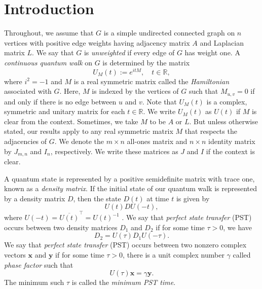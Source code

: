 \documentclass[11pt]{article}
\newcommand{\bx}{\mathbf x}
\newcommand{\by}{\mathbf y}
\def\R{\mathbb{R}}
\begin{document}

\section{Introduction}

Throughout, we assume that $G$ is a simple undirected connected graph on $n$ vertices with positive edge weights having adjacency matrix $A$ and Laplacian matrix $L$. We say that $G$ is \textit{unweighted} if every edge of $G$ has weight one. A \textit{continuous quantum walk} on $G$ is determined by the matrix 
\begin{equation}
\label{Eq:transmat}
U_M(t):=e^{itM}, \quad t\in\R,
\end{equation}
where $i^2=-1$ and $M$ is a real symmetric matrix called the \textit{Hamiltonian} associated with $G$. Here, $M$ is indexed by the vertices of $G$ such that $M_{u,v}=0$ if and only if there is no edge between $u$ and $v$. Note that $U_M(t)$ is a complex, symmetric and unitary matrix for each $t\in \R$. We write $U_M(t)$ as $U(t)$ if $M$ is clear from the context. Sometimes, we take $M$ to be $A$ or $L$. But unless otherwise stated, our results apply to any real symmetric matrix $M$ that respects the adjacencies of $G$. We denote the $m\times n$ all-ones matrix and $n\times n$ identity matrix by $J_{m,n}$ and $I_n$, respectively. We write these matrices as $J$ and $I$ if the context is clear.

A quantum state is represented by a positive semidefinite matrix with trace one, known as a \textit{density matrix}. If the initial state of our quantum walk is represented by a density matrix $D$, then the state $D(t)$ at time $t$ is given by $$U(t)DU(-t),$$ where $U(-t)=\overline{U(t)}^\top=U(t)^{-1}$ \cite{godsil2017real}. We say that \textit{perfect state transfer} (PST) occurs between two density matrices $D_1$ and $D_2$ if for some time $\tau>0$, we have $$D_2=U(\tau)D_1U(-\tau).$$ We say that \textit{perfect state transfer} (PST) occurs between two nonzero complex vectors $\bx$ and $\by$ if for some time $\tau>0$, there is a unit complex number $\gamma$ called \textit{phase factor} such that
\begin{equation}
\label{Eq:1}
U(\tau)\bx=\gamma\by.
\end{equation}
The minimum such $\tau$ is called the \textit{minimum PST time}.
\end{document}
